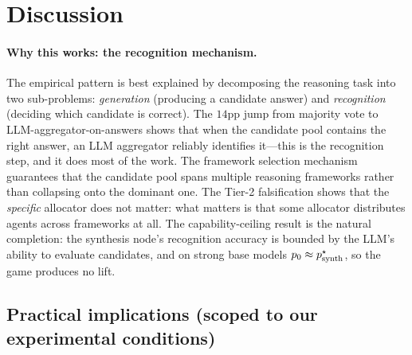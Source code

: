 \documentclass[11pt]{amsart}
\newcommand\1{{\mathds{1}}}
\theoremstyle{definition}
\theoremstyle{remark}
\numberwithin{equation}{section}
\begin{document}
\section{Discussion}\label{sec:discussion}

\paragraph{Why this works: the recognition mechanism.}
The empirical pattern is best explained by decomposing the reasoning task into two sub-problems: \emph{generation} (producing a candidate answer) and \emph{recognition} (deciding which candidate is correct).
The $14$pp jump from majority vote to LLM-aggregator-on-answers shows that when the candidate pool contains the right answer, an LLM aggregator reliably identifies it---this is the recognition step, and it does most of the work.
The framework selection mechanism guarantees that the candidate pool spans multiple reasoning frameworks rather than collapsing onto the dominant one.
The Tier-2 falsification shows that the \emph{specific} allocator does not matter: what matters is that some allocator distributes agents across frameworks at all.
The capability-ceiling result is the natural completion: the synthesis node's recognition accuracy is bounded by the LLM's ability to evaluate candidates, and on strong base models $p_0 \approx p_{\rm synth}^\star$, so the game produces no lift.

\subsection{Practical implications (scoped to our experimental conditions)}\label{sec:decision-tree}
\end{document}
